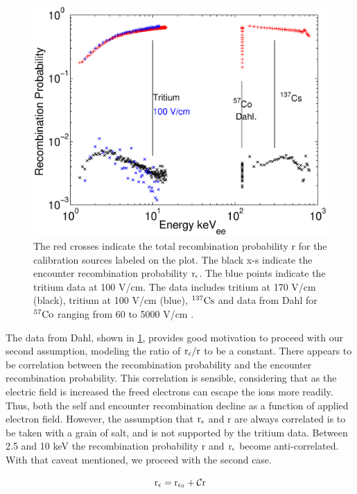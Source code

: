 \renewcommand{\baselinestretch}{1}
\small\normalsize
\begin{figure}[h!]\centering
\includegraphics[width=120mm]{Chapter_Flucs/Figures/Recomb_Flucs/E_r_re.eps}
\caption{ The red crosses indicate the total recombination probability r for the calibration sources labeled on the plot. The black x-s indicate the encounter recombination probability $\rm r_\epsilon$. The blue points indicate the tritium data at 100 V/cm. The data includes tritium at 170 V/cm (black), tritium at 100 V/cm (blue), $\rm ^{137}Cs$ and data from Dahl for $\rm^{57}Co$ ranging from 60 to 5000 V/cm \cite{Dahl_Thesis}.}
\label{fig:Encounter_R_All}
\end{figure}
\renewcommand{\baselinestretch}{2}
\small\normalsize

The data from Dahl, shown in \ref{fig:Encounter_R_All}, provides good motivation to proceed with our second assumption, modeling the ratio of $\rm r_\epsilon/r$ to be a constant. There appears to be correlation between the recombination probability and the encounter recombination probability. This correlation is sensible, considering that as the electric field is increased the freed electrons can escape the ions more readily. Thus, both the self and encounter recombination decline as a function of applied electron field. However, the assumption that $\rm r_\epsilon$ and r are always correlated is to be taken with a grain of salt, and is not supported by the tritium data. Between 2.5 and 10 keV the recombination probability r and $\rm r_\epsilon$ become anti-correlated. With that caveat mentioned, we proceed with the second case.

\begin{equation}
\rm r_\epsilon = r_{\epsilon_0} + \mathcal{C} r
\label{eq:Case_2}
\end{equation}


